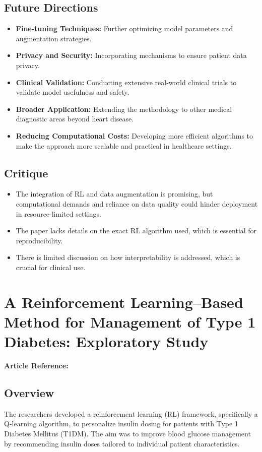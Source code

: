 \subsection*{Future Directions}
\begin{itemize}
    \item \textbf{Fine-tuning Techniques:} Further optimizing model parameters and augmentation strategies.
    \item \textbf{Privacy and Security:} Incorporating mechanisms to ensure patient data privacy.
    \item \textbf{Clinical Validation:} Conducting extensive real-world clinical trials to validate model usefulness and safety.
    \item \textbf{Broader Application:} Extending the methodology to other medical diagnostic areas beyond heart disease.
    \item \textbf{Reducing Computational Costs:} Developing more efficient algorithms to make the approach more scalable and practical in healthcare settings.
\end{itemize}

\subsection*{Critique}
\begin{itemize}
    \item The integration of RL and data augmentation is promising, but computational demands and reliance on data quality could hinder deployment in resource-limited settings.
    \item The paper lacks details on the exact RL algorithm used, which is essential for reproducibility.
    \item There is limited discussion on how interpretability is addressed, which is crucial for clinical use.
\end{itemize}


\section{A Reinforcement Learning–Based Method for Management of Type 1 Diabetes: Exploratory Study}
\textbf{Article Reference:} \cite{javadReinforcementLearningBased2019}

\subsection*{Overview}
The researchers developed a reinforcement learning (RL) framework, specifically a Q-learning algorithm, to personalize insulin dosing for patients with Type 1 Diabetes Mellitus (T1DM). The aim was to improve blood glucose management by recommending insulin doses tailored to individual patient characteristics.

